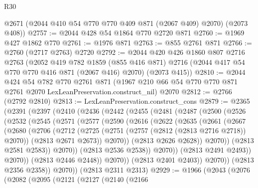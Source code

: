 \begin{lexlean}{R30}
\begin{coremodule}
      @2671
      (@2044 @410 @54 @770 @770 @409 @871 (@2067 @409) @2070)
      (@2073 @408))
@2757 := @2044 @428 @54 @1864 @770 @2720 @871
@2760 := @1969 @427 @1862 @770
@2761 := @1976 @871
@2763 := @855 @2761 @871
@2766 := @2760 (@2717 @2763) @2720
@2792 := @2044
    @420
    @426
    @1860
    @807
    @2716
    @2763
    (@2052
      @419
      @782
      @1859
      (@855 @416 @871)
      @2716
      (@2044 @417 @54 @770 @770 @416 @871 (@2067 @416) @2070)
      (@2073 @415))
@2810 := @2044
    @424
    @54
    @782
    @770
    @2761
    @871
    (@1967 @210 @66 @54 @770 @770 @871 @2761 @2070 LexLeanPreservation.construct_nil)
    @2070
@2812 := @2766 (@2792 @2810)
@2813 := LexLeanPreservation.construct_cons
@2879 := @2365
    (@2391
      (@2397
        (@2410
          (@2436
            (@2442
              (@2455
                (@2481
                  (@2487
                    (@2500
                      (@2526
                        (@2532
                          (@2545
                            (@2571
                              (@2577
                                (@2590
                                  (@2616
                                    (@2622
                                      (@2635
                                        (@2661
                                          (@2667
                                            (@2680
                                              (@2706
                                                (@2712
                                                  (@2725
                                                    (@2751
                                                      (@2757 (@2812 (@2813 @2716 @2718)) @2070))
                                                    (@2813 @2671 @2673))
                                                  @2070))
                                              (@2813 @2626 @2628))
                                            @2070))
                                        (@2813 @2581 @2583))
                                      @2070))
                                  (@2813 @2536 @2538))
                                @2070))
                            (@2813 @2491 @2493))
                          @2070))
                      (@2813 @2446 @2448))
                    @2070))
                (@2813 @2401 @2403))
              @2070))
          (@2813 @2356 @2358))
        @2070))
    (@2813 @2311 @2313)
@2929 := @1966
    (@2043
      (@2076
        (@2082
          (@2095
            (@2121
              (@2127
                (@2140
                  (@2166

\end{coremodule}
\end{lexlean}
